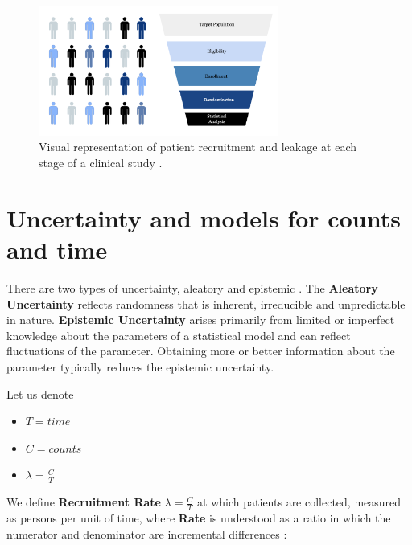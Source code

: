 \begin{figure}[h]
  \centering
  \includegraphics[width=0.7\textwidth]{fig_2_1_b.png}
  \caption{Visual representation of patient recruitment and leakage at each stage of a clinical study \citep{piantadosi2022principles, whelan2018high, bogin2022lasagna}.}
  \label{fig:2_1_b}
\end{figure}

\section{Uncertainty and models for counts and time}

There are two types of uncertainty, aleatory and epistemic \citep{ohagan2006}. The \textbf{Aleatory Uncertainty} reflects randomness that is inherent, irreducible and unpredictable in nature. \textbf{Epistemic Uncertainty} arises primarily from limited or imperfect knowledge about the parameters of a statistical model and can reflect fluctuations of the parameter. Obtaining more or better information about the parameter typically reduces the epistemic uncertainty. 


Let us denote

\begin{itemize}
\item $T=time$
\item $C=counts$
\item $\lambda=\frac{C}{T}$
\end{itemize}

We define \textbf{Recruitment Rate} $\lambda=\frac{C}{T}$ at which patients are collected, measured as persons per unit of time, where \textbf{Rate} is understood as a ratio in which the numerator and denominator are incremental differences \citep{piantadosi2024clinical}:


